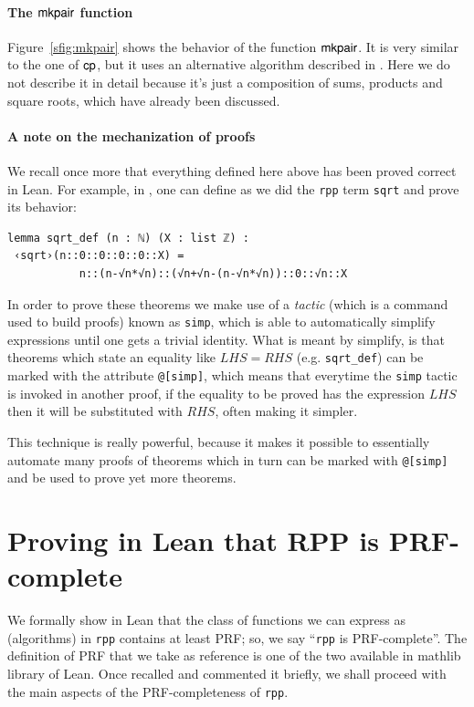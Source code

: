 \documentclass[preprint]{elsarticle}
\theoremstyle{remark}
\newcommand{\RPP}{\textsf{RPP}\xspace}
\newcommand{\PRF}{\textsf{PRF}\xspace}
\newcommand{\MATHLIB}{\textsf{mathlib}\xspace}
\newcommand{\LEAN}{\textsf{Lean}\xspace}
\begin{document}
\paragraph{The $\mathsf{mkpair}$ function}
Figure~\ref{sfig:mkpair} shows the behavior of the function $\mathsf{mkpair}$.
It is very similar to the one of $\mathsf{cp}$, but it uses an alternative algorithm described in \cite{Carneiro19}.
Here we do not describe it in detail because it's just a composition of sums, products and square roots,
which have already been discussed.

\paragraph{A note on the mechanization of proofs}
We recall once more that everything defined here above has been proved correct in \LEAN.
For example, in \cite{MalettoRPPLEAN2021}, one can define as we did the \lstinline|rpp| term \lstinline|sqrt| and prove its behavior:
\begin{lstlisting}
lemma sqrt_def (n : ℕ) (X : list ℤ) :
 ‹sqrt›(n::0::0::0::0::X) =
           n::(n-√n*√n)::(√n+√n-(n-√n*√n))::0::√n::X
\end{lstlisting}
In order to prove these theorems we make use of a {\it tactic} (which is a command used to build proofs)
known as \lstinline|simp|, which is able to automatically simplify expressions
until one gets a trivial identity. What is meant by simplify, is that theorems which state an equality like $LHS = RHS$ (e.g. \lstinline|sqrt_def|)
can be marked with the attribute \lstinline|@[simp]|, which means that everytime the \lstinline|simp| tactic is invoked in another proof,
if the equality to be proved has the expression $LHS$ then it will be substituted with $RHS$, often making it simpler.

This technique is really powerful, because it makes it possible to essentially automate many proofs of theorems which in turn can be marked with \lstinline|@[simp]|
and be used to prove yet more theorems.

\section{Proving in \LEAN that \RPP is \PRF-complete}
\label{section:The UPRF-completeness of RPP}
We formally show in \LEAN that the class of functions we can express as (algorithms) in \lstinline|rpp| contains at least \PRF; so, we say ``\lstinline|rpp| is \PRF-complete''. The definition of \PRF that we take as reference is one of the two available in \MATHLIB library of \LEAN. Once recalled and commented it briefly, we shall proceed with the main aspects of the \PRF-completeness of \lstinline|rpp|.
\end{document}
